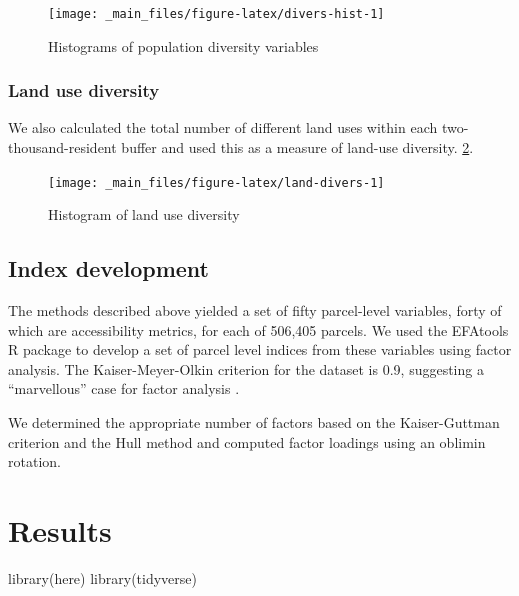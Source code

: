 \documentclass[
]{book}
\newenvironment{Shaded}{\begin{snugshade}}{\end{snugshade}}
\newcommand{\FunctionTok}[1]{\textcolor[rgb]{0.00,0.00,0.00}{#1}}
\newcommand{\NormalTok}[1]{#1}
\begin{document}
\begin{figure}

{\centering \texttt{[image: \_main\_files/figure-latex/divers-hist-1]} 

}

\caption{Histograms of population diversity variables}\label{fig:divers-hist}
\end{figure}

\hypertarget{land-use-diversity}{%
\subsection{Land use diversity}\label{land-use-diversity}}

We also calculated the total number of different land uses within each
two-thousand-resident buffer and used this as a measure of land-use diversity.
\ref{fig:land-divers}.

\begin{figure}

{\centering \texttt{[image: \_main\_files/figure-latex/land-divers-1]} 

}

\caption{Histogram of land use diversity}\label{fig:land-divers}
\end{figure}

\hypertarget{index-development}{%
\section{Index development}\label{index-development}}

The methods described above yielded a set of fifty parcel-level variables,
forty of which are accessibility metrics, for each of 506,405 parcels. We used
the EFAtools R package \citep{EFAtools} to develop a set of parcel level indices from
these variables using factor analysis. The Kaiser-Meyer-Olkin criterion for the
dataset is 0.9, suggesting a ``marvellous'' case for factor analysis \citep{kaiser1974index}.

We determined the appropriate number of factors based on the Kaiser-Guttman criterion
\citep{guttman1954some} and the Hull method \citep{lorenzo2011hull} and computed factor loadings using an oblimin rotation.

\hypertarget{results}{%
\chapter{Results}\label{results}}

\begin{Shaded}
\begin{Highlighting}[]
\FunctionTok{library}\NormalTok{(here)}
\FunctionTok{library}\NormalTok{(tidyverse)}
\end{Highlighting}
\end{Shaded}
\end{document}
